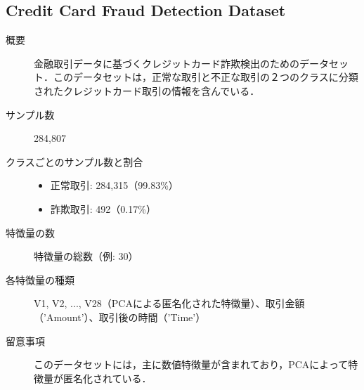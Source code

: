\subsection{Credit Card Fraud Detection Dataset}
\begin{description}
    \item[概要] 金融取引データに基づくクレジットカード詐欺検出のためのデータセット．このデータセットは，正常な取引と不正な取引の２つのクラスに分類されたクレジットカード取引の情報を含んでいる．
    \item[サンプル数] 284,807
    \item[クラスごとのサンプル数と割合] \mbox{}
        \begin{itemize}
            \item 正常取引: 284,315（99.83\%）
            \item 詐欺取引: 492（0.17\%）
        \end{itemize}
    \item[特徴量の数] 特徴量の総数（例: 30）
    \item[各特徴量の種類] \mbox{}
            V1, V2, ..., V28（PCAによる匿名化された特徴量）、取引金額（'Amount'）、取引後の時間（'Time'）
    \item[留意事項] このデータセットには，主に数値特徴量が含まれており，PCAによって特徴量が匿名化されている．
\end{description}
